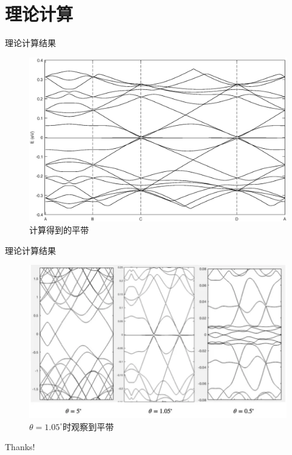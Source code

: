 \documentclass{beamer}
\begin{document}
\section{理论计算}
\begin{frame}{理论计算结果}
    \begin{figure}[htpb]
        \centering
        \includegraphics[width=0.8\linewidth]{pic/untitled.eps}
        
        \caption{计算得到的平带}
    \end{figure}
\end{frame}
\begin{frame}{理论计算结果}
    \begin{figure}[htpb]
        \centering
        \includegraphics[width=0.8\linewidth]{pic/pd.png}
        
        \caption{$\theta=1.05^{\circ}$时观察到平带}
    \end{figure}
\end{frame}


\begin{frame}
    \begin{center}
        {\Huge\calligra Thanks!}
    \end{center}
\end{frame}
\end{document}
